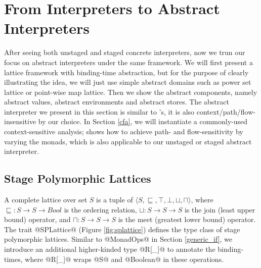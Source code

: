 \section{From Interpreters to Abstract Interpreters} \label{unstaged_abs}

After seeing both unstaged and staged concrete interpreters, now we trun our
focus on abstract interpreters under the same framework. We will first present a
lattice framework with binding-time abstraction, but for the purpose of clearly
illustrating the idea, we will just use simple abstract domains such as power set
lattice or point-wise map lattice. Then we show the abstract components, namely
abstract values, abstract environments and abstract stores.
The abstract interpreter we present in this section is similar to
\citet{DBLP:journals/pacmpl/DaraisLNH17}'s, it is also
context/path/flow-insensitive by our choice.  In Section \ref{cfa}, we will
instantiate a commonly-used context-sensitive analysis;
\citet{Darais:2015:GTM:2814270.2814308} shows how to achieve path- and
flow-sensitivity by varying the monads, which is also applicable to our unstaged
or staged abstract interpreter.

\subsection{Stage Polymorphic Lattices} \label{stagedpoly_lat}

A complete lattice over set $S$ is a tuple of $\langle S, \sqsubseteq, \top,
\bot, \sqcup, \sqcap \rangle$, where $\sqsubseteq : S \to S \to Bool$ is the
ordering relation, $\sqcup: S \to S \to S$ is the join (least upper bound)
operator, and $\sqcap: S \to S \to S$ is the meet (greatest lower bound)
operator. The trait @SPLattice@ (Figure \ref{fig:splattice}) defines the type
class of stage polymorphic lattices. Similar to @MonadOps@ in Section
\ref{generic_if}, we introduce an additional higher-kinded type @R[_]@ to
annotate the binding-times, where @R[_]@ wraps @S@ and @Boolean@ in these
operations.

